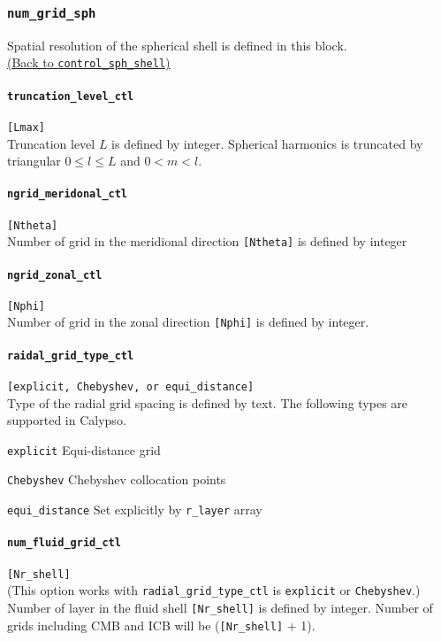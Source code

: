 \subsubsection{\tt num\_grid\_sph}
\label{href_t:num_grid_sph}
Spatial resolution of the spherical shell is defined in this block. \\
\hyperref[href_i:num_grid_sph]{(Back to {\tt control\_sph\_shell})}

\paragraph{\tt truncation\_level\_ctl}
\label{href_t:truncation_level_ctl}
\verb|[Lmax]| \\
Truncation level $L$ is defined by integer. Spherical harmonics is truncated by triangular $0 \le l \le L$ and $0 <m < l$.

\paragraph{\tt ngrid\_meridonal\_ctl}
\label{href_t:ngrid_meridonal_ctl}
\verb|[Ntheta]| \\
Number of grid in the meridional direction \verb|[Ntheta]| is defined by integer
\paragraph{\tt ngrid\_zonal\_ctl}
\label{href_t:ngrid_zonal_ctl}
\verb|[Nphi]| \\
Number of grid in the zonal direction \verb|[Nphi]| is defined by integer.

\paragraph{\tt raidal\_grid\_type\_ctl}
\label{href_t:radial_grid_type_ctl}
\verb|[explicit, Chebyshev, or equi_distance]| \\
Type of the radial grid spacing is defined by text. The following types are supported in Calypso.
%
\begin{description}
	\item{\tt explicit}  Equi-distance grid
	\item{\tt Chebyshev} Chebyshev collocation points
	\item{\tt equi\_distance} Set explicitly by \verb|r_layer| array
\end{description}
%

\paragraph{\tt num\_fluid\_grid\_ctl}
\label{href_t:num_fluid_grid_ctl}
\verb|[Nr_shell]| \\
(This option works with \verb|radial_grid_type_ctl| is {\tt explicit} or {\tt Chebyshev}.)
Number of layer in the fluid shell \verb|[Nr_shell]| is defined by integer. Number of grids including CMB and ICB will be (\verb|[Nr_shell]| + 1).

